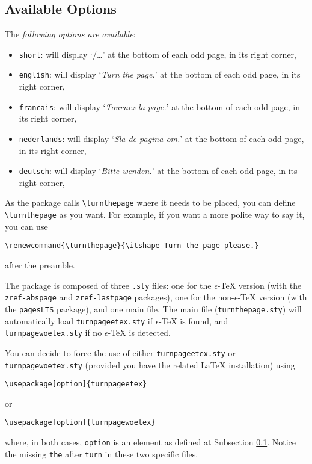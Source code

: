 \documentclass[10pt,a4paper,final,makeidx,twosides]{article}
\newcommand{\etex}{$\epsilon$-\TeX}
\providecommand{\turnthepage}{\textit{Turn the page.}}
\begin{document}
\subsection{Available Options}
\label{subsec:ao}
The \textit{following options are available}:
\begin{itemize}
\item \verb|short|: will display `/\ldots' at the bottom of each odd page, in its right corner, 
\item \verb|english|: will display `\textit{Turn the page.}' at the bottom of each odd page, in its right corner, 
\item \verb|francais|: will display `\textit{Tournez la page.}' at the bottom of each odd page, in its right corner, 
\item \verb|nederlands|: will display `\textit{Sla de pagina om.}' at the bottom of each odd page, in its right corner, 
\item \verb|deutsch|: will display `\textit{Bitte wenden.}' at the bottom of each odd page, in its right corner, 
\end{itemize}
As the package calls \verb|\turnthepage| where it needs to be placed, you can define \verb|\turnthepage| as you want. For example, if you want a more polite way to say it, you can use
\begin{verbatim}
\renewcommand{\turnthepage}{\itshape Turn the page please.}
\end{verbatim}
after the preamble.

The package is composed of three \verb|.sty| files: one for the \etex{} version (with the \verb|zref-abspage| and \verb|zref-lastpage| packages), one for the non-\etex{} version (with the \verb|pagesLTS| package), and one main file. The main file (\verb|turnthepage.sty|) will automatically load \verb|turnpageetex.sty| if \etex{} is found, and \verb|turnpagewoetex.sty| if no \etex{} is detected.

You can decide to force the use of either \verb|turnpageetex.sty| or \verb|turnpagewoetex.sty| (provided you have the related \LaTeX{} installation) using
\begin{verbatim}
\usepackage[option]{turnpageetex}
\end{verbatim}
or
\begin{verbatim}
\usepackage[option]{turnpagewoetex}
\end{verbatim}
where, in both cases, \verb|option| is an element as defined at Subsection \ref{subsec:ao}. Notice the missing \verb|the| after \verb|turn| in these two specific files.
\end{document}
